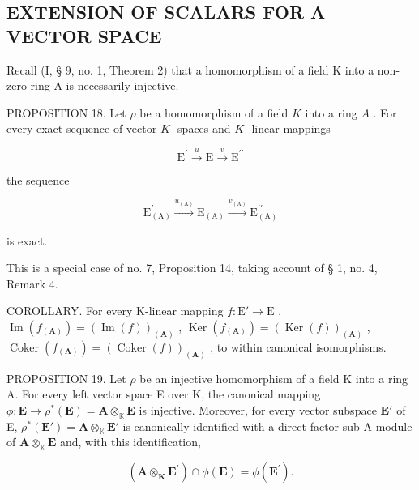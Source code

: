 \subsection{EXTENSION OF SCALARS FOR A VECTOR SPACE}

Recall (I, § 9, no. 1, Theorem 2) that a homomorphism of a field K into a non-zero ring A is necessarily injective.

PROPOSITION 18. Let \(\rho\) be a homomorphism of a field \(K\) into a ring \(A\) . For every exact sequence of vector \(K\) -spaces and \(K\) -linear mappings

\[
\mathrm{E} ^ {\prime} \xrightarrow {u} \mathrm{E} \xrightarrow {v} \mathrm{E} ^ {\prime \prime}
\]

the sequence

\[
\mathrm{E} _ {(\mathrm{A})} ^ {\prime} \xrightarrow {u _ {(\mathrm{A})}} \mathrm{E} _ {(\mathrm{A})} \xrightarrow {v _ {(\mathrm{A})}} \mathrm{E} _ {(\mathrm{A})} ^ {\prime \prime}
\]

is exact.

This is a special case of no. 7, Proposition 14, taking account of § 1, no. 4, Remark 4.

COROLLARY. For every K-linear mapping \(f: \mathrm{E}' \to \mathrm{E}\) , \(\operatorname{Im}(f_{(\mathbf{A})}) = (\operatorname{Im}(f))_{(\mathbf{A})}\) , \(\operatorname{Ker}(f_{(\mathbf{A})}) = (\operatorname{Ker}(f))_{(\mathbf{A})}\) , \(\operatorname{Coker}(f_{(\mathbf{A})}) = (\operatorname{Coker}(f))_{(\mathbf{A})}\) , to within canonical isomorphisms.

PROPOSITION 19. Let \(\rho\) be an injective homomorphism of a field K into a ring A. For every left vector space E over K, the canonical mapping \(\phi: \mathbf{E} \to \rho^{*}(\mathbf{E}) = \mathbf{A} \otimes_{\mathbb{K}} \mathbf{E}\) is injective. Moreover, for every vector subspace \(\mathbf{E}'\) of E, \(\rho^{*}(\mathbf{E}') = \mathbf{A} \otimes_{\mathbb{K}} \mathbf{E}'\) is canonically identified with a direct factor sub-A-module of \(\mathbf{A} \otimes_{\mathbb{K}} \mathbf{E}\) and, with this identification,

\[
(\mathbf {A} \otimes_ {\mathbf {K}} \mathbf {E} ^ {\prime}) \cap \phi (\mathbf {E}) = \phi (\mathbf {E} ^ {\prime}).\tag{35}
\]


